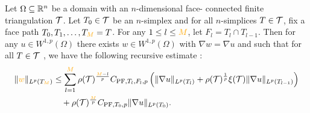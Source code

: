 \documentclass[10pt,letterpaper]{article}
\newcommand\cye[1]{%
  \protect\leavevmode
  \begingroup
    \color{red!35!yellow}%
    #1%
  \endgroup
}
\begin{document}
\begin{theorem}\label{theorem:poincarefriedrichsestimate:gradzwei}
    Let $\Omega \subseteq {\mathbb R}^{n}$ be a domain with an \cye{$n$-dimensional} \cye{face-}connected finite triangulation ${\mathcal T}$.
    Let $T_0 \in {\mathcal T}$ be an $n$-simplex \cye{and} for all $n$-simplices $T \in {\mathcal T}$, 
    fix a \cye{face} path $T_0, T_1, \dots, T_{\cye{M}} = T$. For any $1 \leq l \leq \cye{M}$, let $F_l = T_l \cap T_{l-1}$.
    Then for any $u \in W^{1,p}(\Omega)$ 
    there exists $w \in W^{1,p}(\Omega)$ with $\nabla w = \nabla u$ 
    and such that for all $T \in {\mathcal T}$\cye{, we have the following recursive estimate}:
    \begin{align*}
        \| \cye{w} \|_{L^{p}(T_{\cye{M}})}
        &\leq 
        \sum_{l=1}^{\cye{M}} 
        \rho(\calT)^{\frac {\cye{M}-l} p}
        C_{\PF,T_{l},F_{l},p} 
        \left( 
            \| \nabla u \|_{L^{p}(T_{l})} 
            +
            \rho(\calT)^{\frac {1} p}
            \xi(\calT)
            \| \nabla u \|_{L^{p}(T_{l-1})} 
        \right)
        \\&\quad 
        + \rho(\calT)^{\frac{\cye{M}}{p}}
        C_{\PF,T_{0},p} 
        \| \nabla u \|_{L^{p}( T_{0} )}
        .
    \end{align*}
\end{theorem}
\end{document}
